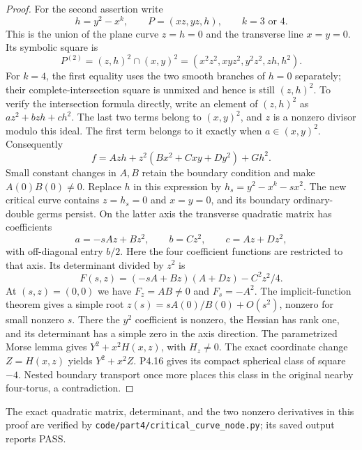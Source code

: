\begin{proof}
For the second assertion write
\[
 h=y^2-x^k,\qquad P=(xz,yz,h),\qquad k=3\text{ or }4.
\]
This is the union of the plane curve $z=h=0$ and the
transverse line $x=y=0$. Its symbolic square is
\[
 P^{(2)}=(z,h)^2\cap(x,y)^2
  =(x^2z^2,xyz^2,y^2z^2,zh,h^2).
\]
For $k=4$, the first equality uses the two smooth branches of
$h=0$ separately; their complete-intersection square is unmixed
and hence is still $(z,h)^2$. To verify the intersection
formula directly, write an element of $(z,h)^2$ as
$az^2+bzh+ch^2$. The last two terms belong to $(x,y)^2$,
and $z$ is a nonzero divisor modulo this ideal. The first term
belongs to it exactly when $a\in(x,y)^2$.
Consequently
\[
 f=Azh+z^2(Bx^2+Cxy+Dy^2)+Gh^2.
\]
Small constant changes in $A,B$ retain the boundary condition
and make $A(0)B(0)\ne0$. Replace $h$ in this expression by
$h_s=y^2-x^k-sx^2$. The new critical curve contains
$z=h_s=0$ and $x=y=0$, and its boundary ordinary-double
germs persist. On the latter axis the transverse quadratic
matrix has coefficients
\[
 a=-sAz+Bz^2,\qquad b=Cz^2,\qquad c=Az+Dz^2,
\]
with off-diagonal entry $b/2$. Here the four coefficient
functions are restricted to that axis. Its determinant
divided by $z^2$ is
\[
 F(s,z)=(-sA+Bz)(A+Dz)-C^2z^2/4.
\]
At $(s,z)=(0,0)$ we have $F_z=AB\ne0$ and
$F_s=-A^2$. The implicit-function theorem gives a simple root
$z(s)=sA(0)/B(0)+O(s^2)$, nonzero for small nonzero $s$.
There the $y^2$ coefficient is nonzero, the Hessian has rank
one, and its determinant has a simple zero in the axis
direction. The parametrized Morse lemma gives
$Y^2+x^2H(x,z)$, with $H_z\ne0$. The exact coordinate
change $Z=H(x,z)$ yields $Y^2+x^2Z$.
P4.16 gives its compact spherical class of square $-4$.
Nested boundary transport once more places this class in
the original nearby four-torus, a contradiction.
\end{proof}

The exact quadratic matrix, determinant, and the two nonzero
derivatives in this proof are verified by
\texttt{code/part4/critical\_curve\_node.py}; its saved output
reports PASS.
